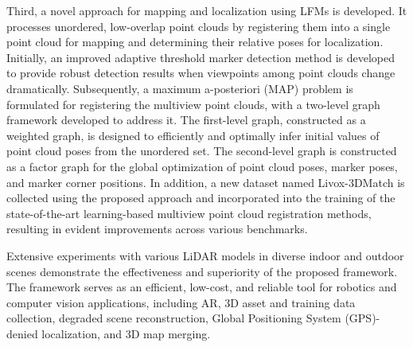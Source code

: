\par
Third, a novel approach for mapping and localization using LFMs is developed. It processes unordered, low-overlap point clouds by registering them into a single point cloud for mapping and determining their relative poses for localization. Initially, an improved adaptive threshold marker detection method is developed to provide robust detection results when viewpoints among point clouds change dramatically. Subsequently, a maximum a-posteriori (MAP) problem is formulated for registering the multiview point clouds, with a two-level graph framework developed to address it. The first-level graph, constructed as a weighted graph, is designed to efficiently and optimally infer initial values of point cloud poses from the unordered set. The second-level graph is constructed as a factor graph for the global optimization of point cloud poses, marker poses, and marker corner positions. In addition, a new dataset named Livox-3DMatch is collected using the proposed approach and incorporated into the training of the state-of-the-art learning-based multiview point cloud registration methods, resulting in evident improvements across various benchmarks.
\par
Extensive experiments with various LiDAR models in diverse indoor and outdoor scenes demonstrate the effectiveness and superiority of the proposed framework. The framework serves as an efficient, low-cost, and reliable tool for robotics and computer vision applications, including AR, 3D asset and training data collection, degraded scene reconstruction, Global Positioning System (GPS)-denied localization, and 3D map merging.


